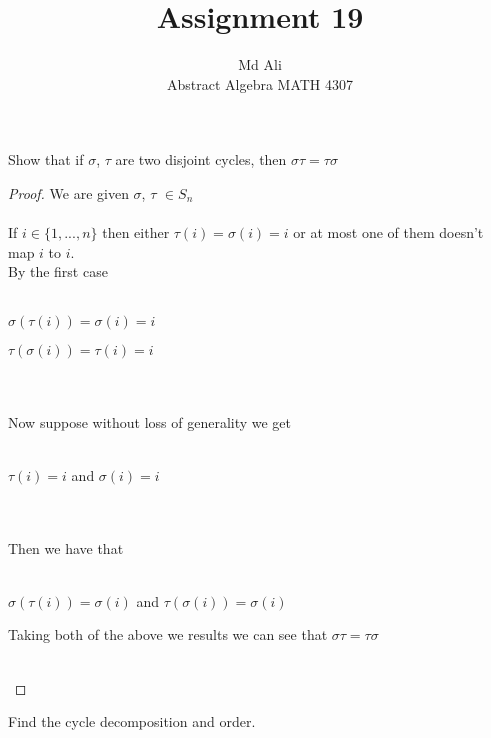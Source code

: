\documentclass[12pt]{article}
\newenvironment{problem}[2][Problem]{\begin{trivlist}
\item[\hskip \labelsep {\bfseries #1}\hskip \labelsep {\bfseries #2.}]}{\end{trivlist}}
\begin{document}
 
 
\title{Assignment 19}%
\author{Md Ali\\ %
Abstract Algebra MATH 4307} %
 
\maketitle
 
\begin{problem}{3.2.1} %
Show that if $\sigma$, $\tau$ are two disjoint cycles, then $\sigma \tau = \tau \sigma$
\end{problem}
 
\begin{proof}
We are given $\sigma$, $\tau$ $\in S_n$ \\ \\
If $i \in \{ 1 ,..., n \}$ then either $\tau (i) = \sigma (i) = i$ or at most one of them doesn't map $i$ to $i$. \\
By the first case \\ \\
\centerline{$\sigma ( \tau (i) ) = \sigma (i) = i$} 
\centerline{$\tau ( \sigma (i) ) = \tau (i) = i$} \\ \\
Now suppose without loss of generality we get \\ \\
\centerline{$\tau (i) = i$ and $\sigma(i) = i$} \\ \\
Then we have that \\ \\
\centerline{$\sigma ( \tau (i) ) = \sigma(i)$ and $\tau ( \sigma (i)) = \sigma(i)$}
Taking both of the above we results we can see that $\sigma \tau = \tau \sigma$ \\ \\
\centerline{}

\end{proof}

\begin{problem}{3.2.2}
Find the cycle decomposition and order.
\end{problem}
\end{document}
